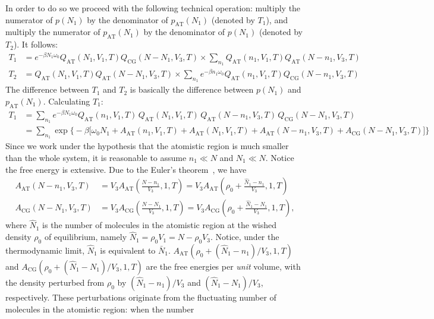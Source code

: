 \documentclass[aip,jcp,a4paper,reprint,onecolumn]{revtex4-1}
\newcommand{\AT}{{\textrm{{AT}}}}
\newcommand{\CG}{{\textrm{CG}}}
\begin{document}
In order to do so we proceed with the following technical operation: multiply the numerator of $p(N_1)$ by the denominator of
$p_{\AT}(N_1)$ (denoted by $T_1$),
and multiply the numerator of $p_{\AT}(N_1)$
by the denominator of $p(N_1)$ (denoted by $T_2$). It follows:
\begin{align}
  T_1
  &=
  e^{-\beta N_1\omega_0}
  Q_{\AT}(N_1,V_1,T) Q_{\CG}(N-N_1,V_3,T)
  \times
  \sum_{n_1}
  Q_{\AT}(n_1,V_1,T) Q_{\AT}(N-n_1,V_3,T)\\
  T_2
  &=
  Q_{\AT}(N_1,V_1,T) Q_{\AT}(N-N_1,V_3,T)
  \times
  \sum_{n_1}
  e^{-\beta n_1\omega_0}
  Q_{\AT}(n_1,V_1,T) Q_{\CG}(N-n_1,V_3,T)
\end{align}
The difference between $T_1$ and $T_2$ is basically the difference
between $p(N_1)$ and $p_{\AT}(N_1)$.
Calculating $T_1$:
\begin{align}\nonumber
  T_1
  &=
  \sum_{n_1}
  e^{-\beta N_1\omega_0}
  Q_{\AT}(n_1,V_1,T)\,
  Q_{\AT}(N_1,V_1,T)\,
  Q_{\AT}(N-n_1,V_3,T)\,
  Q_{\CG}(N-N_1,V_3,T) \\\label{eqn:t1-1}
  &=
  \sum_{n_1}
  \exp
  \big\{-\beta
  \big[
  \omega_0N_1 +
  A_{\AT}(n_1,V_1,T) +
  A_{\AT}(N_1,V_1,T) +
  A_{\AT}(N-n_1,V_3,T) +
  A_{\CG}(N-N_1,V_3,T)
  \big]
  \big\}
\end{align}
Since we work under the hypothesis that the atomistic region is much smaller than the whole system, it
is reasonable to assume $n_1 \ll N$ and $N_1\ll N$.
Notice the free energy is extensive.
Due to the Euler's theorem~\cite{tuckeman2010statistical},
we have
\begin{align}\label{eqn:Aat-0}
  A_{\AT}(N-n_1,V_3,T)
  &= V_3 A_{\AT}(\frac{N-n_1}{V_3},1,T)
  = V_3 A_{\AT}(\rho_0 + \frac{\hat N_1 - n_1}{V_3},1,T)\\\label{eqn:Acg-0}
  A_{\CG}(N-N_1,V_3,T)
  &= V_3 A_{\CG}(\frac{N-N_1}{V_3},1,T)
  = V_3 A_{\CG}(\rho_0 + \frac{\hat N_1 - N_1}{V_3},1,T),
\end{align}
where $\hat N_1$ is the number of molecules in the atomistic region
at the wished density $\rho_0$ of equilibrium, namely
$\hat N_1 = \rho_0V_1 = N - \rho_0 V_3$.
Notice, under the thermodynamic limit, $\hat N_1$ is equivalent to
$\bar N_1$.
$A_{\AT}(\rho_0 + (\hat N_1 - n_1)/{V_3},1,T)$ and
$A_{\CG}(\rho_0 + (\hat N_1 - N_1)/{V_3},1,T)$ are
the free energies per \emph{unit} volume, with
the density perturbed from $\rho_0$ by  $(\hat N_1 - n_1)/{V_3}$
and $(\hat N_1 - N_1)/{V_3}$, respectively.
These perturbations originate from the fluctuating
number of molecules in the atomistic region: when the number
\end{document}
